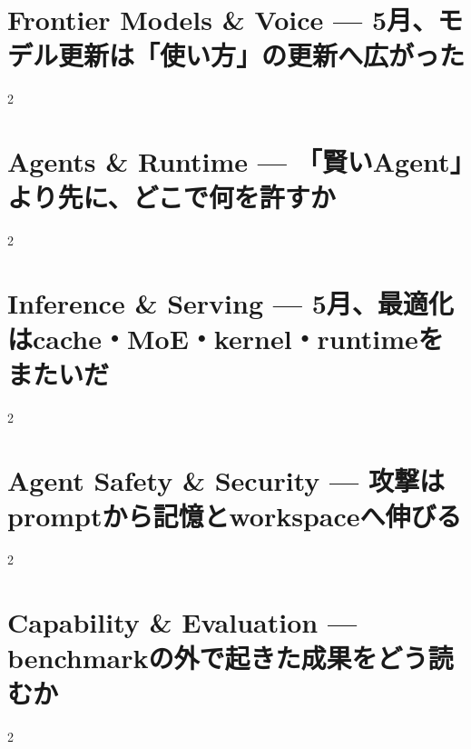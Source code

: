 \documentclass[lualatex,a4paper,11pt]{jlreq}
\begin{document}
\surveycover
\clearpage


\clearpage
\section{Frontier Models \& Voice — 5月、モデル更新は「使い方」の更新へ広がった}
\label{pkg:frontier-models-may}
\vspace{0.15em}
\begin{multicols}{2}

\end{multicols}


\Needspace{0.42\textheight}
\bigskip
\section{Agents \& Runtime — 「賢いAgent」より先に、どこで何を許すか}
\label{pkg:agents-runtime-may}
\vspace{0.15em}
\begin{multicols}{2}

\end{multicols}


\Needspace{0.42\textheight}
\bigskip
\section{Inference \& Serving — 5月、最適化はcache・MoE・kernel・runtimeをまたいだ}
\label{pkg:inference-serving-may}
\vspace{0.15em}
\begin{multicols}{2}

\end{multicols}


\Needspace{0.42\textheight}
\bigskip
\section{Agent Safety \& Security — 攻撃はpromptから記憶とworkspaceへ伸びる}
\label{pkg:agent-safety-security-may}
\vspace{0.15em}
\begin{multicols}{2}

\end{multicols}


\Needspace{0.42\textheight}
\bigskip
\section{Capability \& Evaluation — benchmarkの外で起きた成果をどう読むか}
\label{pkg:capability-evaluation-may}
\vspace{0.15em}
\begin{multicols}{2}

\end{multicols}

\end{document}

